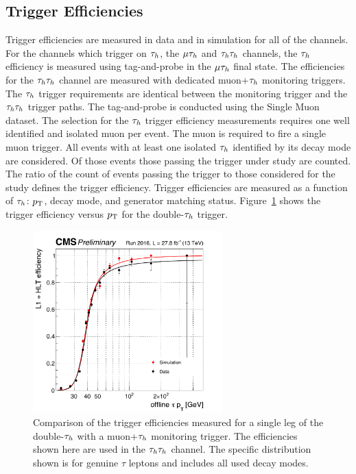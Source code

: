 \subsection{Trigger Efficiencies}
\label{sec:htt_trigger_eff}
Trigger efficiencies are measured in data and in simulation for all of the channels. For the channels
which trigger on $\tau_{h}$, the $\mu\tau_{h}$ and $\tau_{h}\tau_{h}$ channels, the $\tau_{h}$ efficiency is measured
using tag-and-probe in the $\mu\tau_{h}$ final state. The efficiencies for the $\tau_{h}\tau_{h}$ channel
are measured with dedicated muon+$\tau_{h}$ monitoring triggers. The $\tau_{h}$ trigger requirements
are identical between the monitoring trigger and the $\tau_{h}\tau_{h}$ trigger paths. The tag-and-probe
is conducted using the Single Muon dataset. The selection for the $\tau_{h}$ trigger efficiency measurements 
requires one well identified and isolated muon per event. The muon is required to fire a single muon trigger.
All events with at least one isolated $\tau_{h}$ identified by its decay mode are considered.
Of those events those passing the trigger under study are counted.
The ratio of the count of events passing the trigger to those considered for the study
defines the trigger efficiency. Trigger efficiencies are measured as 
a function of $\tau_{h}$: $p_\mathrm{T}$, decay mode, and generator matching status. Figure~\ref{fig:htt_tt_trig}
shows the trigger efficiency versus $p_\mathrm{T}$ for the double-$\tau_{h}$ trigger.

\begin{figure}[!htbp]
\centering
     \includegraphics[width=0.65\textwidth]{higgs_to_taus/plots/htt_tautau_trigger_efficiency.pdf}
     \caption{
Comparison of the trigger efficiencies measured for a single leg of the double-$\tau_{h}$
with a muon+$\tau_{h}$ monitoring trigger. The efficiencies shown here are used in the $\tau_{h}\tau_{h}$ channel.
The specific distribution shown is for genuine $\tau$ leptons and includes all used decay modes.
}
     \label{fig:htt_tt_trig}
\end{figure}

